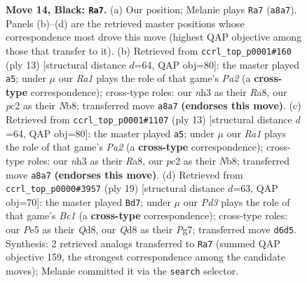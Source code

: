 \documentclass[11pt]{article}
\begin{document}
\begin{figure}[p]
\caption{\textbf{Move 14, Black: \texttt{Ra7}.} (a) Our position; Melanie plays \texttt{Ra7} (\texttt{a8a7}). Panels (b)--(d) are the retrieved master positions whose correspondence most drove this move (highest QAP objective among those that transfer to it). (b) Retrieved from \texttt{ccrl\_top\_p0001\#160} (ply 13) [structural distance $d$=64, QAP obj=80]: the master played \texttt{a5}; under $\mu$ our \emph{Ra1} plays the role of that game's \emph{Pa2} (a \textbf{cross-type} correspondence); cross-type roles: our \emph{n}h3 as their \emph{R}a8, our \emph{p}c2 as their \emph{N}b8; transferred move \texttt{a8a7} \textbf{(endorses this move)}. (c) Retrieved from \texttt{ccrl\_top\_p0001\#1107} (ply 13) [structural distance $d$=64, QAP obj=80]: the master played \texttt{a5}; under $\mu$ our \emph{Ra1} plays the role of that game's \emph{Pa2} (a \textbf{cross-type} correspondence); cross-type roles: our \emph{n}h3 as their \emph{R}a8, our \emph{p}c2 as their \emph{N}b8; transferred move \texttt{a8a7} \textbf{(endorses this move)}. (d) Retrieved from \texttt{ccrl\_top\_p0000\#3957} (ply 19) [structural distance $d$=63, QAP obj=70]: the master played \texttt{Bd7}; under $\mu$ our \emph{Pd3} plays the role of that game's \emph{Bc1} (a \textbf{cross-type} correspondence); cross-type roles: our \emph{P}e5 as their \emph{Q}d8, our \emph{Q}d8 as their \emph{P}g7; transferred move \texttt{d6d5}. Synthesis: 2 retrieved analogs transferred to \texttt{Ra7} (summed QAP objective 159, the strongest correspondence among the candidate moves); Melanie committed it via the \texttt{search} selector.}
\label{fig:thought-m27}
\end{figure}

\clearpage
\end{document}
